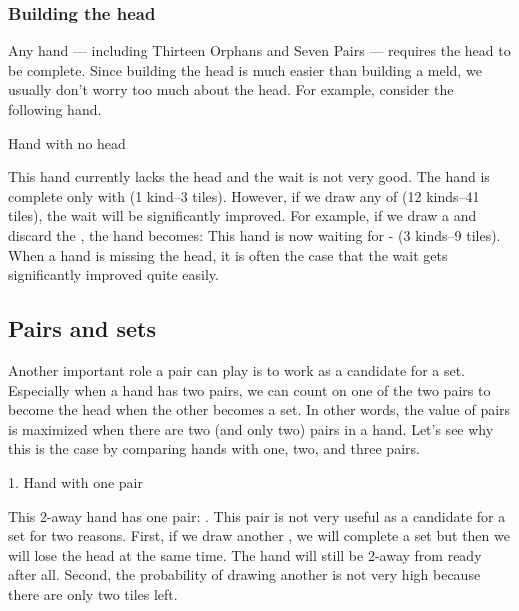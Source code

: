 \subsubsection{Building the head}
Any hand --- including Thirteen Orphans and Seven Pairs --- requires the head to be complete. Since building the head is much easier than building a meld, we usually don't worry too much about the head. For example, consider the following hand. 
\bigskip
\begin{itembox}[r]{Hand with no head}
\bp
{}
\ep
\end{itembox}
This hand currently lacks the head and the wait is not very good. The hand is complete only with {\large{}} (1 kind--3 tiles).
However, if we draw any of {\large{}} (12 kinds--41 tiles), the wait will be significantly improved. 
For example, if we draw a {\large{}} and discard the {\large{}}, the hand becomes:
\bp
{}
\ep
This hand is now waiting for {\large{} -} (3 kinds--9 tiles). 
When a hand is missing the head, it is often the case that the wait gets significantly improved quite easily. 

\subsection{Pairs and sets} \label{sec:2pairs}
Another important role a pair can play is to work as a candidate for a set. 
Especially when a hand has two pairs, we can count on one of the two pairs to become the head when the other becomes a set. In other words, the value of pairs is maximized when there are two (and only two) pairs in a hand. Let's see why this is the case by comparing hands with one, two, and three pairs. 

\begin{itembox}[r]{1. Hand with one pair}
\bp
{}\bei
\ep
\end{itembox}
\noindent
This 2-away hand has one pair: {\large{}}. This pair is not very useful as a candidate for a set for two reasons. First, if we draw another {\large{}}, we will complete a set but then we will lose the head at the same time. The hand will still be 2-away from ready after all. Second, the probability of drawing another {\large{}} is not very high because there are only two tiles left. 

